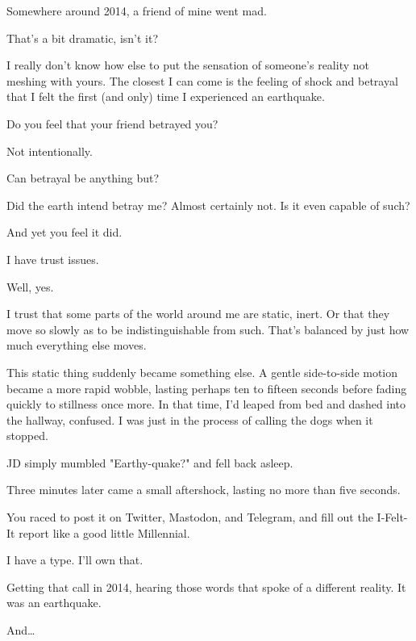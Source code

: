\noindent Somewhere around 2014, a friend of mine went mad.

\begin{ally}
That's a bit dramatic, isn't it?
\end{ally}
I really don't know how else to put the sensation of someone's reality not meshing with yours. The closest I can come is the feeling of shock and betrayal that I felt the first (and only) time I experienced an earthquake.

\begin{ally}
Do you feel that your friend betrayed you?
\end{ally}
Not intentionally.

\begin{ally}
Can betrayal be anything but?
\end{ally}
Did the earth intend betray me? Almost certainly not. Is it even capable of such?

\begin{ally}
And yet you feel it did.
\end{ally}
I have trust issues.

\begin{ally}
Well, yes.
\end{ally}
I trust that some parts of the world around me are static, inert. Or that they move so slowly as to be indistinguishable from such. That's balanced by just how much everything else moves.

This static thing suddenly became something else. A gentle side-to-side motion became a more rapid wobble, lasting perhaps ten to fifteen seconds before fading quickly to stillness once more. In that time, I'd leaped from bed and dashed into the hallway, confused. I was just in the process of calling the dogs when it stopped.

JD simply mumbled "Earthy-quake?" and fell back asleep.

Three minutes later came a small aftershock, lasting no more than five seconds.

\begin{ally}
You raced to post it on Twitter, Mastodon, and Telegram, and fill out the I-Felt-It report like a good little Millennial.
\end{ally}
I have a type. I'll own that.

Getting that call in 2014, hearing those words that spoke of a different reality. It was an earthquake.

And\ldots{}

